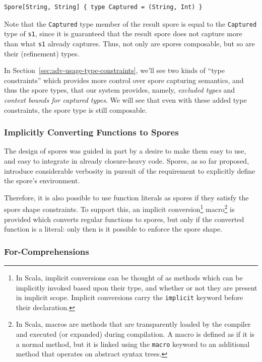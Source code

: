 \documentclass{llncs}
\begin{document}
\begin{lstlisting}[numbers=none]
    Spore[String, String] { type Captured = (String, Int) }
\end{lstlisting}

Note that the \verb|Captured| type member of the result spore is equal to the
\verb|Captured| type of \verb|s1|, since it is guaranteed that the result
spore does not capture more than what \verb|s1| already captures. Thus, not
only are spores composable, but so are their (refinement) types.

In Section~\ref{sec:adv-usage-type-constraints}, we'll see two kinds of ``type
constraints'' which provides more control over spore capturing semantics, and
thus the spore types, that our system provides, namely, {\em excluded types} and
{\em context bounds for captured types}. We will see that even with these added type constraints, the spore type is still composable.

\subsubsection{Implicitly Converting Functions to Spores}

The design of spores was guided in part by a desire to make them easy to use,
and easy to integrate in already closure-heavy code. Spores, as so far
proposed, introduce considerable verbosity in pursuit of the requirement to
explicitly define the spore's environment.

Therefore, it is also possible to use function literals as spores if they
satisfy the spore shape constraints. To support this, an implicit
conversion\footnote{In Scala, implicit conversions can be thought of as methods which can be implicitly invoked based upon their type, and whether or not they are present in implicit scope. Implicit conversions carry the \texttt{implicit} keyword before their declaration.}
macro\footnote{In Scala, macros are methods that are transparently loaded by the compiler and executed (or expanded) during compilation. A macro is defined as if it is a normal method, but it is linked using the \texttt{macro} keyword to an additional method that operates on abstract syntax trees.} is provided which converts regular
functions to spores, but only if the converted function is a literal: only
then is it possible to enforce the spore shape.

\subsubsection{For-Comprehensions}
\end{document}
